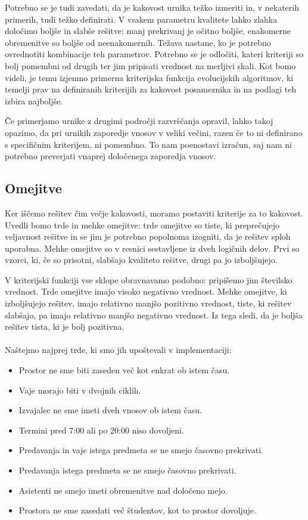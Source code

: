 \documentclass[a4paper,12pt]{book}
\begin{document}
Potrebno se je tudi zavedati, da je kakovost urnika težko izmeriti in, v nekaterih primerih, tudi težko definirati. V vsakem parametru kvalitete lahko zlahka določimo boljše in slabše rešitve: manj prekrivanj je očitno boljše, enakomerne obremenitve so boljše od neenakomernih. Težava nastane, ko je potrebno ovrednotiti kombinacije teh parametrov. Potrebno se je odločiti, kateri kriteriji so bolj pomembni od drugih ter jim pripisati vrednost na merljivi skali. Kot bomo videli, je temu izjemno primerna kriterijska funkcija evolucijskih algoritmov, ki temelji prav na definiranih kriterijih za kakovost posameznika in na podlagi teh izbira najboljše. 

Če primerjamo urnike z drugimi področji razvrščanja opravil, lahko takoj opazimo, da pri urnikih zaporedje vnosov v veliki večini, razen če to ni definirano s specifičnim kriterijem, ni pomembno. To nam poenostavi izračun, saj nam ni potrebno preverjati vnaprej določenega zaporedja vnosov. 

\subsection{Omejitve}
\label{sec:fitness-items}
Ker iščemo rešitev čim večje kakovosti, moramo postaviti kriterije za to kakovost. Uvedli bomo trde in mehke omejitve: trde omejitve so tiste, ki preprečujejo veljavnost rešitve in se jim je potrebno popolnoma izogniti, da je rešitev sploh uporabna. Mehke omejitve so v resnici sestavljene iz dveh logičnih delov. Prvi so vzorci, ki, če so prisotni, slabšajo kvaliteto rešitve, drugi pa jo izboljšujejo. 

V kriterijski funkciji vse sklope obravnavamo podobno: pripišemo jim številsko vrednost. Trde omejitve imajo visoko negativno vrednost. Mehke omejitve, ki izboljšujejo rešitev, imajo relativno manjšo pozitivno vrednost, tiste, ki rešitev slabšajo, pa imajo relativno manjšo negativno vrednost. Iz tega sledi, da je boljša rešitev tista, ki je bolj pozitivna. 
\\
\\
Naštejmo najprej trde, ki smo jih upoštevali v implementaciji:
\begin{itemize}
\item Prostor ne sme biti zaseden več kot enkrat ob istem času.
\item Vaje morajo biti v dvojnih ciklih.
\item Izvajalec ne sme imeti dveh vnosov ob istem času. 
\item Termini pred 7:00 ali po 20:00 niso dovoljeni. 
\item Predavanja in vaje istega predmeta se ne smejo časovno prekrivati. 
\item Predavanja istega predmeta se ne smejo časovno prekrivati.
\item Asistenti ne smejo imeti obremenitve nad določeno mejo. 
\item Prostora ne sme zasedati več študentov, kot to prostor dovoljuje. 
\end{itemize}
\end{document}
